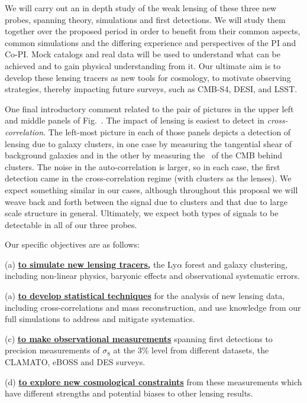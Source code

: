 We will carry out an in depth study of 
the weak lensing of these three new probes, spanning theory, 
simulations and first detections. 
We will study them together over the proposed period in order to benefit from
their common aspects, common
simulations and
the differing experience and perspectives of the PI and Co-PI.
Mock catalogs and  real data will be used to understand what can be achieved and to gain physical understanding
from it. Our ultimate aim is to develop these lensing tracers as new tools
for cosmology, to motivate 
observing strategies, thereby impacting future surveys, such as CMB-S4, DESI, and LSST. 

One final introductory comment related to the pair of pictures in the upper left and middle panels of Fig.~. The impact of lensing is easiest to detect in {\it cross-correlation}. The left-most picture in each of those panels depicts a detection of lensing due to galaxy clusters, in one case by measuring the tangential shear of background galaxies and in the other by measuring the \atf\ of the CMB behind clusters. The noise in the auto-correlation is larger, so in each case, the first detection came in the cross-correlation regime (with clusters as the lenses). We expect something similar in our cases, although throughout this proposal we will weave back and forth between the signal due to clusters and that due to large scale structure in general. Ultimately, we expect both types of signals to be detectable in all of our three  probes.

Our specific objectives are as follows:

(a) {\bf \underline{to simulate new lensing tracers,}} the Ly$\alpha$ forest and galaxy clustering,
 including non-linear physics, baryonic effects and observational
systematic errors.

(a) {\bf \underline{to develop statistical techniques}} for the analysis of new lensing data, including 
cross-correlations and mass reconstruction, and use knowledge from our full simulations to address and mitigate systematics.


(c) {\bf \underline{to make observational measurements}} spanning first 
detections to precision measurements of $\sigma_{8}$ at the 3\% level 
from different datasets, the CLAMATO, eBOSS and DES surveys.

(d) {\bf \underline{to explore new cosmological constraints}} from these
measurements which have different strengths and potential biases  to other
lensing results.

